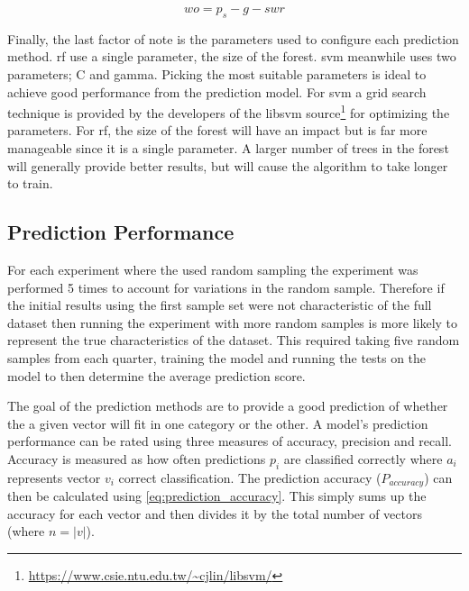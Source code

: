 \begin{equation} 
\label{eq:window_offset}
wo = p_s - g - swr 
\end{equation}

Finally, the last factor of note is the parameters used to configure each prediction method. \gls{rf} use a single parameter, the size of the forest. \gls{svm} meanwhile uses two parameters; C and gamma. Picking the most suitable parameters is ideal to achieve good performance from the prediction model. For \gls{svm} a grid search technique is provided by the developers of the libsvm source\footnote{\url{https://www.csie.ntu.edu.tw/~cjlin/libsvm/}} for optimizing the parameters. For \gls{rf}, the size of the forest will have an impact but is far more manageable since it is a single parameter. A larger number of trees in the forest will generally provide better results, but will cause the algorithm to take longer to train.

\subsection{Prediction Performance}

For each experiment where the used random sampling the experiment was performed 5 times to account for variations in the random sample. Therefore if the initial results using the first sample set were not characteristic of the full dataset then running the experiment with more random samples is more likely to represent the true characteristics of the dataset. This required taking five random samples from each quarter, training the model and running the tests on the model to then determine the average prediction score. %

The goal of the prediction methods are to provide a good prediction of whether the a given vector will fit in one category or the other. A model's prediction performance can be rated using three measures of accuracy, precision and recall. Accuracy is measured as how often predictions $p_i$ are classified correctly where $a_i$ represents vector $v_i$ correct classification. The prediction accuracy ($P_{accuracy}$) can then be calculated using \autoref{eq:prediction_accuracy}. This simply sums up the accuracy for each vector and then divides it by the total number of vectors (where $n = |v|$).

